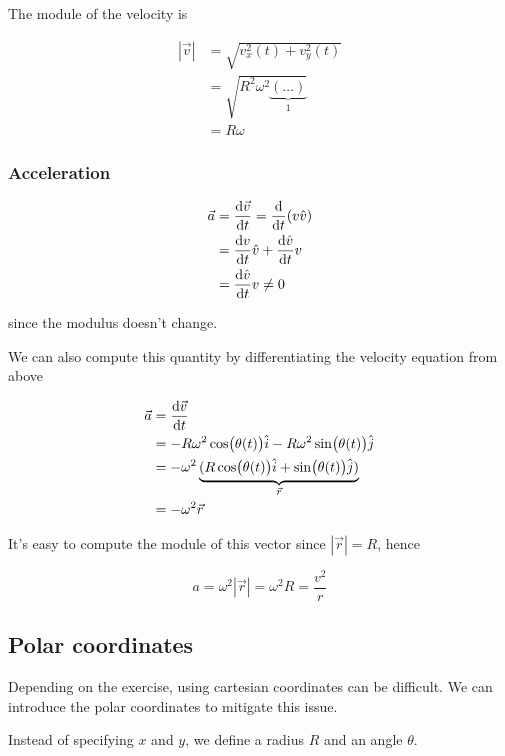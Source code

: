 \documentclass[10pt]{extarticle}
\begin{document}
The module of the velocity is

\begin{align*}
    |\vec v| & = \sqrt{v_x^2(t) + v_y^2(t)}                 \\
             & = \sqrt{R^2 \omega^2 \underbrace{(\dots)}_1} \\
             & = R\omega
\end{align*}

\subsubsection{Acceleration}

\begin{align*}
    \vec a & = \dv {\vec v}{t} = \dv {t} (v \hat v) \\
           & = \dv {v}{t}\hat v + \dv{\hat v}{t} v  \\
           & = \dv {\hat v}{t} v \ne 0
\end{align*}

since the modulus doesn't change.

We can also compute this quantity by differentiating the velocity equation from above

\begin{align*}
    \vec a & = \dv{\vec v}{t}                                                                          \\
           & = - R \omega ^2 \cos (\theta(t)) \hat i - R \omega^2 \sin (\theta(t)) \hat j              \\
           & = - \omega^2 \underbrace{(R \cos (\theta(t)) \hat i +  \sin (\theta(t)) \hat j)}_{\vec r} \\
           & = -\omega^2 \vec r
\end{align*}

It's easy to compute the module of this vector since $|\vec r| = R$, hence

$$
    a = \omega^2  |\vec r| = \omega^2 R = \frac{v ^2}{r}
$$

\subsection{Polar coordinates}

Depending on the exercise, using cartesian coordinates can be difficult.
We can introduce the polar coordinates to mitigate this issue.

Instead of specifying $x$ and $y$, we define a radius $R$ and an angle $\theta$.
\end{document}
